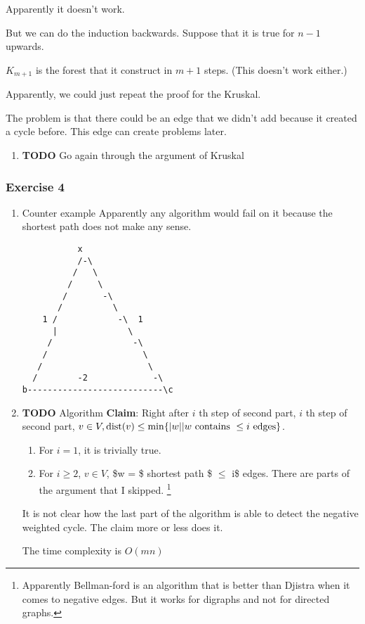 \documentclass[11pt]{article}
\def\min{\operatorname{min}}
\def\dist{\operatorname{dist}}
\begin{document}
Apparently it doesn't work.

But we can do the induction backwards. Suppose that it is true for \(n-1\)
upwards.

\(K_{m+1}\) is the forest that it construct in \(m+1\) steps. (This doesn't work
either.)

Apparently, we could just repeat the proof for the Kruskal.

The problem is that there could be an edge that we didn't add because it
created a cycle before. This edge can create problems later.
\begin{enumerate}
\item {\bfseries\sffamily TODO} Go again through the argument of Kruskal
\label{sec:org893cc44}
\end{enumerate}
\subsubsection{Exercise 4}
\label{sec:org04cd6c4}
\begin{enumerate}
\item Counter example
\label{sec:org201562f}
Apparently any algorithm would fail on it because the shortest path does
not make any sense.
\begin{verbatim}
           x
           /-\
          /   \
         /     \
        /       -\
       /          \
    1 /            -\  1       
      |              \        
     /                -\      
    /                   \     
   /                     \    
  /        -2             -\  
b---------------------------\c
\end{verbatim}
\item {\bfseries\sffamily TODO} Algorithm
\label{sec:org244a16f}
\textbf{Claim}: Right after \(i\) th step of second part, \(i\) th step of second
 part, \(v \in V, \dist(v) \le \min \{ \vert w\vert \vert w \textup{
      contains } \le i \textup{ edges} \}\).

\begin{enumerate}
\item For \(i=1\), it is trivially true.
\item For \(i\ge 2\), \(v \in V\), \$w = \$ shortest path \$ \(\le\) i\$ edges. There are
parts of the argument that I skipped. \footnote{Apparently Bellman-ford is an algorithm that is better than Djistra when
it comes to negative edges. But it works for digraphs and not for directed
graphs.}
\end{enumerate}

It is not clear how the last part of the algorithm is able to detect the
negative weighted cycle. The claim more or less does it.

The time complexity is \(O(mn)\)
\end{enumerate}
\end{document}
